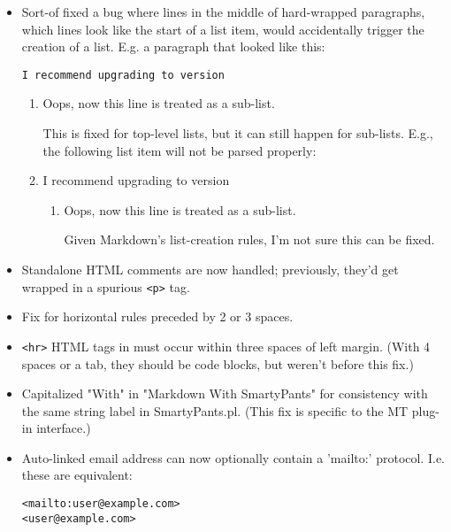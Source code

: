 \begin{itemize}
\item 

Sort-of fixed a bug where lines in the middle of hard-wrapped
paragraphs, which lines look like the start of a list item,
would accidentally trigger the creation of a list. E.g. a
paragraph that looked like this:\begin{lstlisting}
I recommend upgrading to version
\end{lstlisting}
\begin{enumerate}
\item 

Oops, now this line is treated
as a sub-list.

This is fixed for top-level lists, but it can still happen for
sub-lists. E.g., the following list item will not be parsed
properly:
\item I recommend upgrading to version\begin{enumerate}
\item 

Oops, now this line is treated
as a sub-list.

Given Markdown's list-creation rules, I'm not sure this can
be fixed.
\end{enumerate}

\end{enumerate}

\item 

Standalone HTML comments are now handled; previously, they'd get
wrapped in a spurious \texttt{<p>} tag.
\item 

Fix for horizontal rules preceded by 2 or 3 spaces.
\item 

\texttt{<hr>} HTML tags in must occur within three spaces of left
margin. (With 4 spaces or a tab, they should be code blocks, but
weren't before this fix.)
\item 

Capitalized "With" in "Markdown With SmartyPants" for
consistency with the same string label in SmartyPants.pl.
(This fix is specific to the MT plug-in interface.)
\item 

Auto-linked email address can now optionally contain
a 'mailto:' protocol. I.e. these are equivalent:\begin{lstlisting}
<mailto:user@example.com>
<user@example.com>
\end{lstlisting}


\end{itemize}

